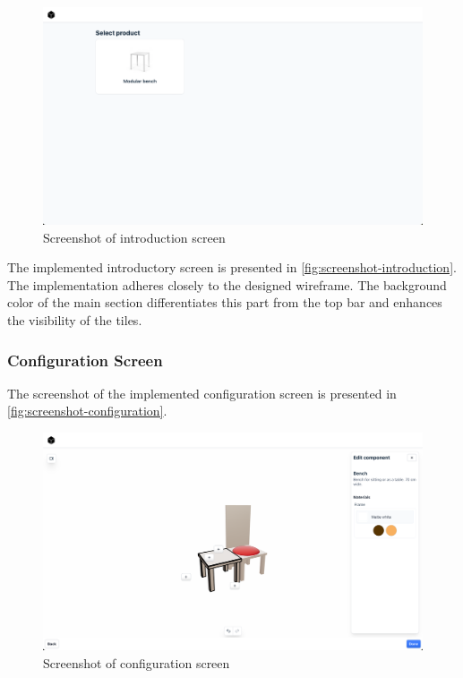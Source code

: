 \begin{figure}[h]
\centering
\includegraphics[width=\textwidth]{images/screenshot_introduction.png}
\caption{Screenshot of introduction screen}
\label{fig:screenshot-introduction}
\end{figure}

The implemented introductory screen is presented in \autoref{fig:screenshot-introduction}. The implementation adheres closely to the designed wireframe. The background color of the main section differentiates this part from the top bar and enhances the visibility of the tiles.


\subsubsection{Configuration Screen}

The screenshot of the implemented configuration screen is presented in \autoref{fig:screenshot-configuration}.

\begin{figure}[h]
\centering
\includegraphics[width=\textwidth]{images/screenshot_configuration.png}
\caption{Screenshot of configuration screen}
\label{fig:screenshot-configuration}
\end{figure}

